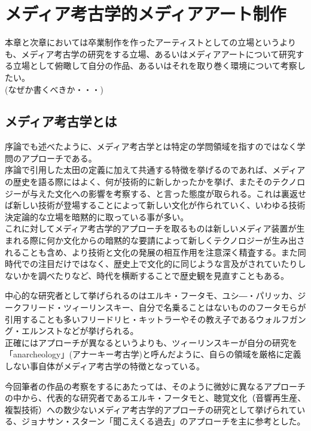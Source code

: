 \chapter{メディア考古学的メディアアート制作}\label{ux30e1ux30c7ux30a3ux30a2ux8003ux53e4ux5b66ux7684ux30e1ux30c7ux30a3ux30a2ux30a2ux30fcux30c8ux5236ux4f5c}

本章と次章においては卒業制作を作ったアーティストとしての立場というよりも、メディア考古学の研究をする立場、あるいはメディアアートについて研究する立場として俯瞰して自分の作品、あるいはそれを取り巻く環境について考察したい。\\
(なぜか書くべきか・・・)

\section{メディア考古学とは}\label{ux30e1ux30c7ux30a3ux30a2ux8003ux53e4ux5b66ux3068ux306f}

序論でも述べたように、メディア考古学とは特定の学問領域を指すのではなく学問のアプローチである。\\
序論で引用した太田の定義に加えて共通する特徴を挙げるのであれば、メディアの歴史を語る際にはよく、何が技術的に新しかったかを挙げ、またそのテクノロジーが与えた文化への影響を考察する、と言った態度が取られる。これは裏返せば新しい技術が登場することによって新しい文化が作られていく、いわゆる技術決定論的な立場を暗黙的に取っている事が多い。\\
これに対してメディア考古学的アプローチを取るものは新しいメディア装置が生まれる際に何か文化からの暗黙的な要請によって新しくテクノロジーが生み出されることも含め、より技術と文化の発展の相互作用を注意深く精査する。また同時代での注目だけではなく、歴史上で文化的に同じような言及がされていたりしないかを調べたりなど、時代を横断することで歴史観を見直すこともある。

中心的な研究者として挙げられるのはエルキ・フータモ、ユシ―・パリッカ、ジークフリード・ツィーリンスキー、自分で名乗ることはないもののフータモらが引用することも多いフリードリヒ・キットラーやその教え子であるウォルフガング・エルンストなどが挙げられる。\\
正確にはアプローチが異なるというよりも、ツィーリンスキーが自分の研究を「anarcheology」(アナーキー考古学)と呼んだように、自らの領域を厳格に定義しない事自体がメディア考古学の特徴となっている。

今回筆者の作品の考察をするにあたっては、そのように微妙に異なるアプローチの中から、代表的な研究者であるエルキ・フータモと、聴覚文化（音響再生産、複製技術）への数少ないメディア考古学的アプローチの研究として挙げられている、ジョナサン・スターン「聞こえくる過去」\autocite{stern:audiblepast}のアプローチを主に参考とした。

